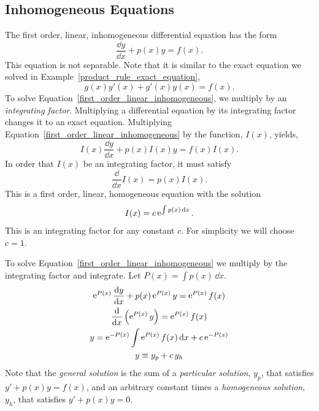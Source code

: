 \subsection{Inhomogeneous Equations}






The first order, linear, inhomogeneous differential equation has the form
\begin{equation}
  \label{first_order_linear_inhomogeneous}
  \frac{\dd y}{\dd x} + p(x) y = f(x).
\end{equation}
This equation is not separable.  Note that it is similar to the exact equation
we solved in Example~\ref{product_rule_exact_equation},
\[
g(x) y'(x) + g'(x) y(x) = f(x).
\]
To solve Equation~\ref{first_order_linear_inhomogeneous}, 
we multiply by an \textit{integrating factor}.
Multiplying a differential equation by its integrating factor changes it to 
an exact equation.   Multiplying 
Equation~\ref{first_order_linear_inhomogeneous} by the function,
$I(x)$, yields,
\[
I(x) \frac{\dd y}{\dd x} + p(x) I(x) y = f(x) I(x).
\]
In order that $I(x)$ be an integrating factor, it must satisfy
\[
\frac{\dd}{\dd x} I(x) = p(x) I(x).
\]
This is a first order, linear, homogeneous equation with the solution
\[
I(x) = c \mathop{\mathrm{e}}\nolimits^{\int p(x) \,\mathrm{d} x}.
\]
This is an integrating factor for any constant $c$.  For simplicity we will
choose $c = 1$.




To solve Equation~\ref{first_order_linear_inhomogeneous} we
multiply by the integrating factor and integrate.
Let $P(x) = \int p(x)\,\dd x$.
\begin{gather*}
  \mathop{\mathrm{e}}\nolimits^{P(x)} \frac{\mathrm{d} y}{\mathrm{d} x} + p(x) \mathop{\mathrm{e}}\nolimits^{P(x)} y = \mathop{\mathrm{e}}\nolimits^{P(x)}f(x) \\
  \frac{\mathrm{d}}{\mathrm{d} x} \left(\mathop{\mathrm{e}}\nolimits^{P(x)} y \right) = \mathop{\mathrm{e}}\nolimits^{P(x)}f(x) \\
  y = \mathop{\mathrm{e}}\nolimits^{-P(x)}\int \mathop{\mathrm{e}}\nolimits^{P(x)} f(x)\,\mathrm{d} x + c \mathop{\mathrm{e}}\nolimits^{-P(x)} \\
  y \equiv y_p + c \, y_h
\end{gather*}
Note that the \textit{general solution} is the sum of a  
\textit{particular solution}, $y_p$, that satisfies $y' + p(x) y = f(x)$,  
and an arbitrary constant times a \textit{homogeneous solution}, 
$y_h$, that satisfies $y' + p(x) y = 0$.





